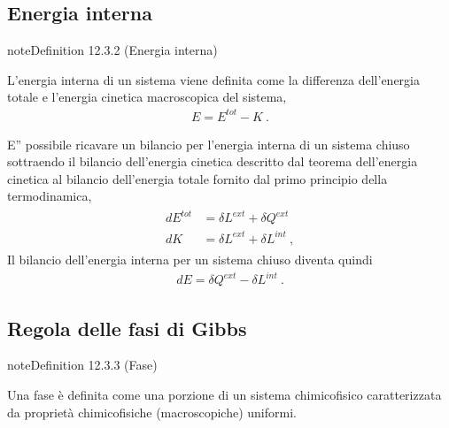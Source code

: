 \documentclass[letterpaper,10pt,italian]{jupyterBook}
\begin{document}
\subsection{Energia interna}
\label{\detokenize{ch/thermodynamics/principles-gibbs-phase-rule:energia-interna}}\label{\detokenize{ch/thermodynamics/principles-gibbs-phase-rule:physics-hs-thermodynamics-foundation-principles-gibbs-phase-rule-internal-energy}}\label{ch/thermodynamics/principles-gibbs-phase-rule:definition-2}
\begin{sphinxadmonition}{note}{Definition 12.3.2 (Energia interna)}



\sphinxAtStartPar
L’energia interna di un sistema viene definita come la differenza dell’energia totale e l’energia cinetica macroscopica del sistema,
\begin{equation*}
\begin{split}E = E^{tot} - K \ .\end{split}
\end{equation*}\end{sphinxadmonition}

\sphinxAtStartPar
E” possibile ricavare un bilancio per l’energia interna di un sistema chiuso sottraendo il bilancio dell’energia cinetica descritto dal teorema dell’energia cinetica al bilancio dell’energia totale fornito dal primo principio della termodinamica,
\begin{equation*}
\begin{split}\begin{aligned}
  d E^{tot} & = \delta L^{ext} + \delta Q^{ext} \\
  d K       & = \delta L^{ext} + \delta L^{int} \ ,
\end{aligned}\end{split}
\end{equation*}
\sphinxAtStartPar
Il bilancio dell’energia interna per un sistema chiuso diventa quindi
\begin{equation*}
\begin{split}d E = \delta Q^{ext} - \delta L^{int} \ .\end{split}
\end{equation*}

\subsection{Regola delle fasi di Gibbs}
\label{\detokenize{ch/thermodynamics/principles-gibbs-phase-rule:regola-delle-fasi-di-gibbs}}\label{\detokenize{ch/thermodynamics/principles-gibbs-phase-rule:physics-hs-thermodynamics-foundation-principles-gibbs-phase-rule-gibbs-phase-rule}}\label{ch/thermodynamics/principles-gibbs-phase-rule:definition-3}
\begin{sphinxadmonition}{note}{Definition 12.3.3 (Fase)}



\sphinxAtStartPar
Una fase è definita come una porzione di un sistema chimico\sphinxhyphen{}fisico caratterizzata da proprietà chimico\sphinxhyphen{}fisiche (macroscopiche) uniformi.
\end{sphinxadmonition}
\end{document}
